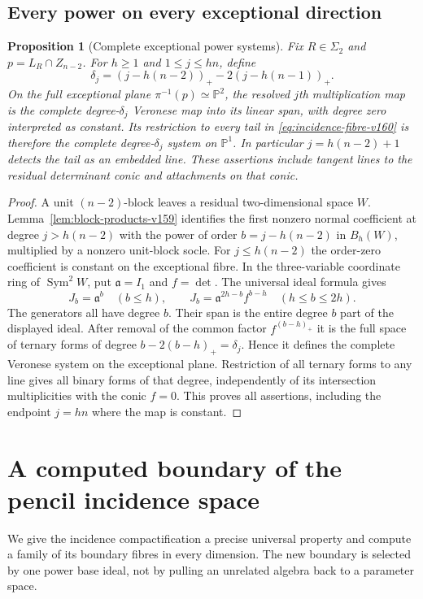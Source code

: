 \documentclass[11pt,reqno]{amsart}
\numberwithin{equation}{section}
\newtheorem{proposition}[theorem]{Proposition}
\theoremstyle{definition}\newtheorem{definition}[theorem]{Definition}
\theoremstyle{remark}\newtheorem{remark}[theorem]{Remark}
\newcommand{\Pj}{\mathbb P}\newcommand{\A}{\mathbb A}
\DeclareMathOperator{\Sym}{Sym}\DeclareMathOperator{\Gr}{Gr}
\begin{document}
\subsection{Every power on every exceptional direction}
\begin{proposition}[Complete exceptional power systems]
\label{prop:exceptional-powers-v160}
Fix $R\in\Sigma_2$ and $p=L_R\cap Z_{n-2}$. For $h\geq1$ and
$1\leq j\leq hn$, define
\begin{equation}\label{eq:exceptional-delta-v160}
 \delta_j=(j-h(n-2))_+-2(j-h(n-1))_+.
\end{equation}
On the full exceptional plane $\pi^{-1}(p)\simeq\Pj^2$, the resolved
$j$th multiplication map is the complete degree-$\delta_j$ Veronese
map into its linear span, with degree zero interpreted as constant.
Its restriction to every tail in \eqref{eq:incidence-fibre-v160} is
therefore the complete degree-$\delta_j$ system on $\Pj^1$.
In particular $j=h(n-2)+1$ detects the tail as an embedded line.
These assertions include tangent lines to the residual determinant
conic and attachments on that conic.
\end{proposition}
\begin{proof}
A unit $(n-2)$-block leaves a residual two-dimensional space $W$.
Lemma~\ref{lem:block-products-v159} identifies the first nonzero
normal coefficient at degree $j>h(n-2)$ with the power of order
$b=j-h(n-2)$ in $B_h(W)$, multiplied by a nonzero unit-block socle.
For $j\leq h(n-2)$ the order-zero coefficient is constant on the
exceptional fibre. In the three-variable coordinate ring of
$\Sym^2W$, put $\mathfrak a=I_1$ and $f=\det$. The universal ideal
formula gives
\[
 J_b=\mathfrak a^b\quad(b\leq h),\qquad
 J_b=\mathfrak a^{2h-b}f^{b-h}\quad(h\leq b\leq2h).
\]
The generators all have degree $b$. Their span is the entire degree
$b$ part of the displayed ideal. After removal of the common factor
$f^{(b-h)_+}$ it is the full space of ternary forms of degree
$b-2(b-h)_+=\delta_j$. Hence it defines the complete Veronese system
on the exceptional plane. Restriction of all ternary forms to any
line gives all binary forms of that degree, independently of its
intersection multiplicities with the conic $f=0$. This proves all
assertions, including the endpoint $j=hn$ where the map is constant.
\end{proof}


\section{A computed boundary of the pencil incidence space}
\label{sec:computed-boundary-v158}
We give the incidence compactification a precise universal property and
compute a family of its boundary fibres in every dimension. The new
boundary is selected by one power base ideal, not by pulling an
unrelated algebra back to a parameter space.
\end{document}

